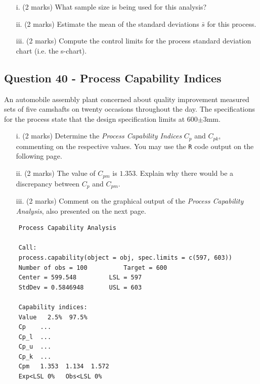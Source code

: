 \documentclass[a4paper,12pt]{article}
\begin{document}
\begin{itemize}
	\item[i.] (2 marks) What sample size is being used for this analysis?
	\item[ii.] (2 marks) Estimate the mean of the standard deviations $\bar{s}$ for this process.
	\item[iii.] (2 marks) Compute the control limits for the process standard deviation chart (i.e. the s-chart).
\end{itemize}

\subsection*{Question 40 - Process Capability Indices}

An automobile assembly plant concerned about quality improvement measured sets of five camshafts on twenty occasions throughout the day. The specifications for the process state that the design specification limits at 600$\pm$3mm.


\begin{itemize}
	\item[i.] (2 marks) Determine the \emph{Process Capability Indices} $C_p$ and $C_{pk}$, commenting on the respective values. You may use the \texttt{R} code output on the following page.
	\item[ii.] (2 marks)  The value of $C_{pm}$ is $1.353$. Explain why there would be a discrepancy between $C_p$ and $C_{pm}$.
	\item[iii.] (2 marks) Comment on the graphical output of the \emph{Process Capability Analysis}, also presented on the next page.
\end{itemize}


\newpage
\begin{framed}
	\begin{verbatim}
	Process Capability Analysis
	
	Call:
	process.capability(object = obj, spec.limits = c(597, 603))
	Number of obs = 100          Target = 600
	Center = 599.548         LSL = 597
	StdDev = 0.5846948       USL = 603
	
	Capability indices:
	Value   2.5%  97.5%
	Cp    ...
	Cp_l  ...
	Cp_u  ...
	Cp_k  ...
	Cpm   1.353  1.134  1.572
	Exp<LSL 0%   Obs<LSL 0%
	\end{verbatim}
\end{framed}
\end{document}
